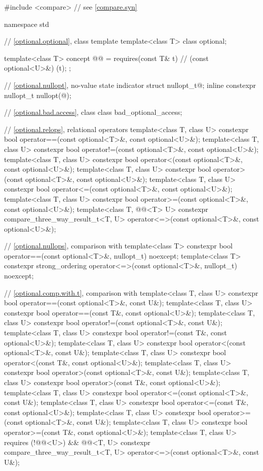 %
\begin{codeblock}
#include <compare>              // see \ref{compare.syn}

namespace std {
  // \ref{optional.optional}, class template 
  template<class T>
    class optional;

  template<class T>
    concept @@ = requires(const T& t) {       // (const optional<U>&){ }(t);
    };

  // \ref{optional.nullopt}, no-value state indicator
  struct nullopt_t{@\seebelow@};
  inline constexpr nullopt_t nullopt(@\unspec@);

  // \ref{optional.bad.access}, class 
  class bad_optional_access;

  // \ref{optional.relops}, relational operators
  template<class T, class U>
    constexpr bool operator==(const optional<T>&, const optional<U>&);
  template<class T, class U>
    constexpr bool operator!=(const optional<T>&, const optional<U>&);
  template<class T, class U>
    constexpr bool operator<(const optional<T>&, const optional<U>&);
  template<class T, class U>
    constexpr bool operator>(const optional<T>&, const optional<U>&);
  template<class T, class U>
    constexpr bool operator<=(const optional<T>&, const optional<U>&);
  template<class T, class U>
    constexpr bool operator>=(const optional<T>&, const optional<U>&);
  template<class T, @@<T> U>
    constexpr compare_three_way_result_t<T, U>
      operator<=>(const optional<T>&, const optional<U>&);

  // \ref{optional.nullops}, comparison with 
  template<class T> constexpr bool operator==(const optional<T>&, nullopt_t) noexcept;
  template<class T>
    constexpr strong_ordering operator<=>(const optional<T>&, nullopt_t) noexcept;

  // \ref{optional.comp.with.t}, comparison with 
  template<class T, class U> constexpr bool operator==(const optional<T>&, const U&);
  template<class T, class U> constexpr bool operator==(const T&, const optional<U>&);
  template<class T, class U> constexpr bool operator!=(const optional<T>&, const U&);
  template<class T, class U> constexpr bool operator!=(const T&, const optional<U>&);
  template<class T, class U> constexpr bool operator<(const optional<T>&, const U&);
  template<class T, class U> constexpr bool operator<(const T&, const optional<U>&);
  template<class T, class U> constexpr bool operator>(const optional<T>&, const U&);
  template<class T, class U> constexpr bool operator>(const T&, const optional<U>&);
  template<class T, class U> constexpr bool operator<=(const optional<T>&, const U&);
  template<class T, class U> constexpr bool operator<=(const T&, const optional<U>&);
  template<class T, class U> constexpr bool operator>=(const optional<T>&, const U&);
  template<class T, class U> constexpr bool operator>=(const T&, const optional<U>&);
  template<class T, class U>
      requires (!@@<U>) && @@<T, U>
    constexpr compare_three_way_result_t<T, U>
      operator<=>(const optional<T>&, const U&);

}
\end{codeblock}
